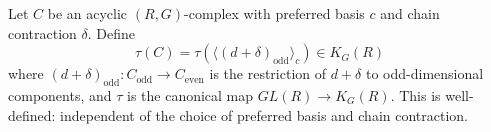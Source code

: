 Let $C$ be an acyclic $(R, G)$-complex with preferred basis $c$ and chain contraction $\delta$. Define
$$\tau(C) = \tau(\langle (d + \delta)_{\text{odd}} \rangle_c) \in K_G(R)$$
where $(d + \delta)_{\text{odd}}: C_{\text{odd}} \to C_{\text{even}}$ is the restriction of $d + \delta$ to odd-dimensional components, and $\tau$ is the canonical map $GL(R) \to K_G(R)$. This is well-defined: independent of the choice of preferred basis and chain contraction.
